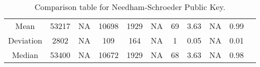 \begin{table}[!ht]
{{\begin{tabular}{c|ccc|ccc|ccc|c}
                \multicolumn{1}{c|}{Mean}      & 53217                                               & NA                                      & 10698                                  & 1929    & NA       & 69       & 3.63    & NA       & 0.99     & \multicolumn{1}{l}{}                                                                             \\ \cline{1-10}
                \multicolumn{1}{c|}{Deviation} & 2802                                                & NA                                      & 109                                    & 164     & NA       & 1        & 0.05    & NA       & 0.01     & \multicolumn{1}{l}{}                                                                             \\ \cline{1-10}
                \multicolumn{1}{c|}{Median}    & 53400                                               & NA                                      & 10672                                  & 1929    & NA       & 68       & 3.63    & NA       & 0.98     & \multicolumn{1}{l}{\parbox[t]{1em}{}}  \\
            \end{tabular}
        }
    }
    \caption{Comparison table for Needham-Schroeder Public Key.}
    \label{tab:NSPK}
\end{table}